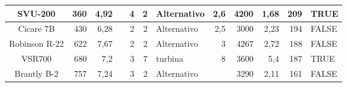 \begin{table}[htbp]
\begin{tabular}{|c|r|r|r|r|r|l|r|r|r|r|l|}
		\midrule
		\rowcolor[rgb]{ .329,  .506,  .208} \textcolor[rgb]{ 1,  1,  1}{SVU-200} & \cellcolor[rgb]{ .659,  .816,  .553}360 & \cellcolor[rgb]{ .659,  .816,  .553}4,92 & \cellcolor[rgb]{ 1,  1,  0} & \cellcolor[rgb]{ .659,  .816,  .553}4 & \cellcolor[rgb]{ .659,  .816,  .553}2 & \cellcolor[rgb]{ .659,  .816,  .553}Alternativo & \cellcolor[rgb]{ .659,  .816,  .553}2,6 & \cellcolor[rgb]{ .659,  .816,  .553}4200 & \cellcolor[rgb]{ .659,  .816,  .553}1,68 & \cellcolor[rgb]{ .659,  .816,  .553}209 & \cellcolor[rgb]{ .659,  .816,  .553}TRUE \\
		\midrule
		\rowcolor[rgb]{ .329,  .506,  .208} \textcolor[rgb]{ 1,  1,  1}{Cicare 7B} & \cellcolor[rgb]{ .659,  .816,  .553}430 & \cellcolor[rgb]{ .659,  .816,  .553}6,28 & \cellcolor[rgb]{ 1,  1,  0} & \cellcolor[rgb]{ .659,  .816,  .553}2 & \cellcolor[rgb]{ .659,  .816,  .553}2 & \cellcolor[rgb]{ .659,  .816,  .553}Alternativo & \cellcolor[rgb]{ .659,  .816,  .553}2,5 & \cellcolor[rgb]{ .659,  .816,  .553}3000 & \cellcolor[rgb]{ .659,  .816,  .553}2,23 & \cellcolor[rgb]{ .659,  .816,  .553}194 & \cellcolor[rgb]{ .659,  .816,  .553}FALSE \\
		\midrule
		\rowcolor[rgb]{ .329,  .506,  .208} \textcolor[rgb]{ 1,  1,  1}{Robinson R-22} & \cellcolor[rgb]{ .659,  .816,  .553}622 & \cellcolor[rgb]{ .659,  .816,  .553}7,67 & \cellcolor[rgb]{ 1,  1,  0} & \cellcolor[rgb]{ .659,  .816,  .553}2 & \cellcolor[rgb]{ .659,  .816,  .553}2 & \cellcolor[rgb]{ .659,  .816,  .553}Alternativo & \cellcolor[rgb]{ .659,  .816,  .553}3 & \cellcolor[rgb]{ .659,  .816,  .553}4267 & \cellcolor[rgb]{ .659,  .816,  .553}2,72 & \cellcolor[rgb]{ .659,  .816,  .553}188 & \cellcolor[rgb]{ .659,  .816,  .553}FALSE \\
		\midrule
		\rowcolor[rgb]{ .329,  .506,  .208} \textcolor[rgb]{ 1,  1,  1}{VSR700} & \cellcolor[rgb]{ .659,  .816,  .553}680 & \cellcolor[rgb]{ .659,  .816,  .553}7,2 & \cellcolor[rgb]{ 1,  1,  0} & \cellcolor[rgb]{ .659,  .816,  .553}3 & \cellcolor[rgb]{ .659,  .816,  .553}7 & \cellcolor[rgb]{ .659,  .816,  .553}turbina & \cellcolor[rgb]{ .659,  .816,  .553}8 & \cellcolor[rgb]{ .659,  .816,  .553}3600 & \cellcolor[rgb]{ .659,  .816,  .553}5,4 & \cellcolor[rgb]{ .659,  .816,  .553}187 & \cellcolor[rgb]{ .659,  .816,  .553}TRUE \\
		\midrule
		\rowcolor[rgb]{ .329,  .506,  .208} \textcolor[rgb]{ 1,  1,  1}{Brantly B-2} & \cellcolor[rgb]{ .659,  .816,  .553}757 & \cellcolor[rgb]{ .659,  .816,  .553}7,24 & \cellcolor[rgb]{ 1,  1,  0} & \cellcolor[rgb]{ .659,  .816,  .553}3 & \cellcolor[rgb]{ .659,  .816,  .553}2 & \cellcolor[rgb]{ .659,  .816,  .553}Alternativo & \multicolumn{1}{l|}{\cellcolor[rgb]{ .659,  .816,  .553}\newline{}} & \cellcolor[rgb]{ .659,  .816,  .553}3290 & \cellcolor[rgb]{ .659,  .816,  .553}2,11 & \cellcolor[rgb]{ .659,  .816,  .553}161 & \cellcolor[rgb]{ .659,  .816,  .553}FALSE \\

\end{tabular}
\end{table}
